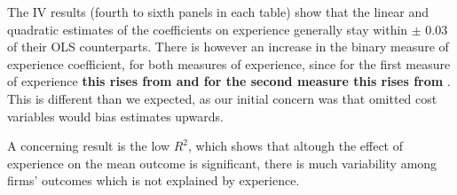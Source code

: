 The IV results (fourth to sixth panels in each table) show that  the linear and quadratic estimates of the coefficients on experience generally stay within $\pm$ 0.03 of their OLS counterparts. There is however an increase in the binary measure of experience coefficient, for both measures of experience, since for the first measure of experience \textbf{this rises from and for the second measure this rises from} . This is different than we expected, as our initial concern was that omitted cost variables would bias estimates upwards.

A concerning result is the low $R^2$, which shows that altough the effect of experience on the mean outcome is significant, there is much variability among firms' outcomes which is not explained by experience.

\begin{table}[!htbp] \centering
  \caption{Regression results for OLS and IV specifications where experience is computed in 2-year rolling periods}
  \label{tab:table_exp_1}
\end{table}
